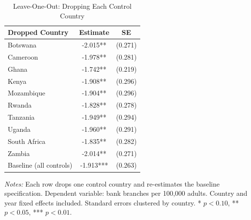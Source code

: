 \begin{table}[H]
\centering
\caption{Leave-One-Out: Dropping Each Control Country}
\label{tab:loo}
\begin{threeparttable}
\begin{tabular}{lcc}
\toprule
Dropped Country & Estimate & SE \\
\midrule
Botswana & -2.015** & (0.271) \\
Cameroon & -1.978** & (0.281) \\
Ghana & -1.742** & (0.219) \\
Kenya & -1.908** & (0.296) \\
Mozambique & -1.904** & (0.296) \\
Rwanda & -1.828** & (0.278) \\
Tanzania & -1.949** & (0.294) \\
Uganda & -1.960** & (0.291) \\
South Africa & -1.835** & (0.282) \\
Zambia & -2.014** & (0.271) \\
\midrule
Baseline (all controls) & -1.913*** & (0.263) \\
\bottomrule
\end{tabular}
\begin{tablenotes}[flushleft]
\footnotesize
\item \textit{Notes:} Each row drops one control country and re-estimates the baseline specification.
Dependent variable: bank branches per 100,000 adults. Country and year fixed effects included.
Standard errors clustered by country.
* $p<0.10$, ** $p<0.05$, *** $p<0.01$.
\end{tablenotes}
\end{threeparttable}
\end{table}
